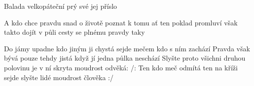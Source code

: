 \begin{TEXT}{Balada velkopáteční}
\SLOKA {}  prý\NL
{} své 
 jej  příslo\NL

A kdo chce pravdu snad\NL
o životě poznat\NL
k tomu ať ten poklad promluví\NL
{} však takto dojít \NL
{} v půli cesty \NL
{} se   plnému \NL
{} pravdy  taky 

\SLOKA Do jámy upadne\NL
kdo jiným ji chystá\NL
sejde mečem kdo s ním zachází\NL
Pravda však bývá\NL
pouze tehdy jistá\NL
když jí jedna půlka neschází\NL
Slyšte proto všichni druhou polovinu\NL
je v ní skryta moudrost odvěká:\NL
/: Ten kdo meč odmítá ten na kříži sejde\NL
slyšte lidé moudrost člověka :/
\end{TEXT}
